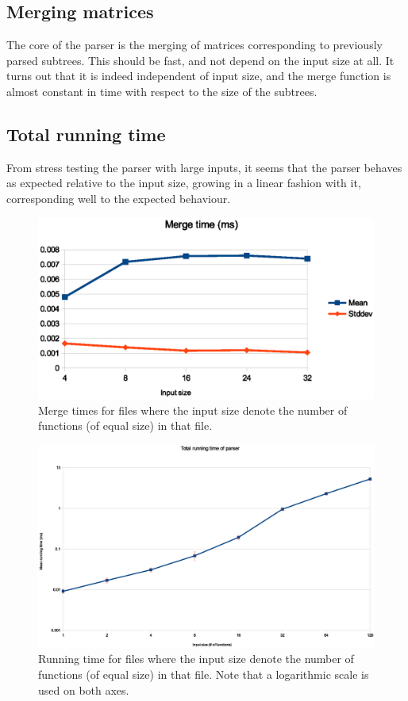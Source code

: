 \documentclass[a4paper,12pt,twosided]{report}
\begin{document}
\subsection{Merging matrices}
The core of the parser is the merging of matrices corresponding to previously
parsed subtrees. This should be fast, and not depend on the input size at all.
It turns out that it is indeed independent of input size, and the merge function
is almost constant in time with respect to the size of the subtrees.

\subsection{Total running time}
From stress testing the parser with large inputs, it seems that the parser
behaves as expected relative to the input size, growing in a linear fashion with
it, corresponding well to the expected behaviour.

\begin{figure}[H]
\includegraphics[width=\textwidth]{criterion-merge.eps}
\caption{\label{critmerge}Merge times for files where the input size denote the
number of functions (of equal size) in that file.}
\end{figure}

\begin{figure}[H]
\includegraphics[width=\textwidth]{criterion-1-128.eps}
\caption{\label{criterion}Running time for files where the input size denote the
number of functions (of equal size) in that file. Note that a logarithmic scale
is used on both axes.}
\end{figure}
\end{document}
